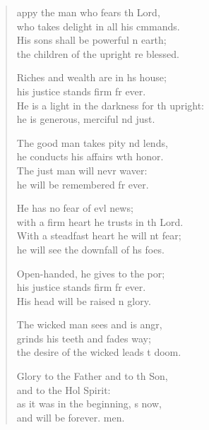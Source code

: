 \settowidth{\versewidth}{He is a light in the darkness for the upright: *}
\begin{verse}%
  \begin{patverse}
appy the man who fears th Lord,\Med\\
who takes delight in all his cmmands.\\
His sons shall be powerful n earth;\Med\\
the children of the upright re blessed.

Riches and wealth are in hs house;\Med\\
his justice stands firm fr ever.\\
He is a light in the darkness for th upright:\Med\\
he is generous, merciful nd just.

The good man takes pity nd lends,\Med\\
he conducts his affairs wth honor.\\
The just man will nevr waver:\Med\\
he will be remembered fr ever.

He has no fear of evl news;\Med\\
with a firm heart he trusts in th Lord.\\
With a steadfast heart he will nt fear;\Med\\
he will see the downfall of hs foes.

Open-handed, he gives to the por;\Flex\\
his justice stands firm fr ever.\Med\\
His head will be raised n glory.

The wicked man sees and is angr,\Flex\\
grinds his teeth and fades way;\Med\\
the desire of the wicked leads t doom.

Glory to the Father and to th Son,\Med\\
and to the Hol Spirit:\\
as it was in the beginning, s now,\Med\\
and will be forever. men. 
  \end{patverse}
\end{verse}
